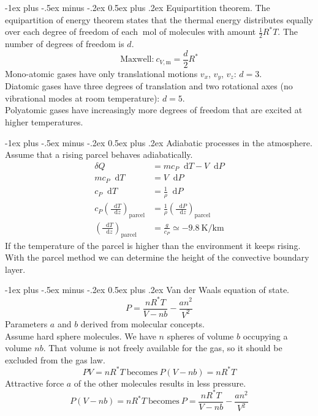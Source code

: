 \documentclass[10pt,landscape,a4paper]{article}
\makeatletter
\renewcommand\d{\mathop{}\!\mathrm{d}}
\renewcommand{\section}{\@startsection{section}{1}{0mm}%
	{-1ex plus -.5ex minus -.2ex}%
	{0.5ex plus .2ex}%
	{\normalfont\large\bfseries}}
\makeatother
\begin{document}
\begin{multicols}{3}
		\section{Equipartition theorem.}
		The equipartition of energy theorem states that the thermal energy distributes equally over each degree of freedom of each $ \SI{}{\mole} $ of molecules with amount $ \frac{1}{2}R^\ast T $.
		The number of degrees of freedom is $ d $.
		\[
			\text{Maxwell:} \ c_{V,\text{m}}=\frac{d}{2}R^\ast
		\]
		Mono-atomic gases have only translational motions $ v_x $, $ v_y $, $ v_z $: $ d=3 $.\\
		Diatomic gases have three degrees of translation and two rotational axes (no vibrational modes at room temperature): $ d=5 $.\\
		Polyatomic gases have increasingly more degrees of freedom that are excited at higher temperatures.
		
		\section{Adiabatic processes in the atmosphere.}
		Assume that a rising parcel behaves adiabatically.
			\begin{align*}
				\delta Q&=mc_P\d T-V\d P\\
				mc_P\d T&=V\d P\\
				c_P\d T&=\frac{1}{\rho}\d P\\
				c_P\left(\frac{\d T}{\d z}\right)_\text{parcel}&=\frac{1}{\rho}\left(\frac{\d P}{\d z}\right)_\text{parcel}\\
				\left(\frac{\d T}{\d z}\right)_\text{parcel}&=\frac{g}{c_P}\simeq\SI{-9.8}{\kelvin\per\kilo\meter}
			\end{align*}
		If the temperature of the parcel is higher than the environment it keeps rising.
		With the parcel method we can determine the height of the convective boundary layer.
		
		\section{Van der Waals equation of state.}
		\[
			P=\frac{nR^\ast T}{V-nb}-\frac{an^2}{V^2}
		\]
		Parameters $ a $ and $ b $ derived from molecular concepts.\\
		Assume hard sphere molecules.
		We have $ n $ spheres of volume $ b $ occupying a volume $ nb $.
		That volume is not freely available for the gas, so it should be excluded from the gas law.
		\[
			PV=nR^\ast T \ \text{becomes} \ P(V-nb)=nR^\ast T
		\]
		Attractive force $ a $ of the other molecules results in less pressure.
		\[
			P(V-nb)=nR^\ast T \ \text{becomes} \ P=\frac{nR^\ast T}{V-nb}-\frac{an^2}{V^2}
		\]
		

\end{multicols}
\end{document}
